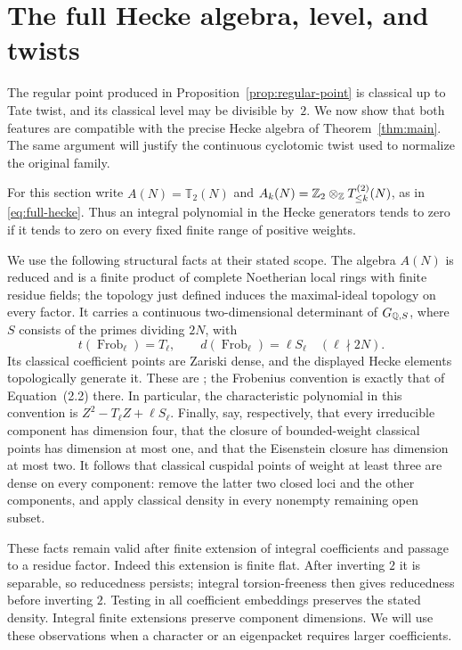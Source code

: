 \section{The full Hecke algebra, level, and twists}
\label{sec:hecke}

The regular point produced in Proposition~\ref{prop:regular-point}
is classical up to Tate twist, and its classical level may be divisible
by~$2$.  We now show that both features are compatible with the precise
Hecke algebra of Theorem~\ref{thm:main}.  The same argument will justify
the continuous cyclotomic twist used to normalize the original family.

For this section write $A(N)=\mathbb T_2(N)$ and
$A_k(N)=\mathbb Z_2\otimes_{\mathbb Z}T_{\leq k}^{(2)}(N)$, as in
\eqref{eq:full-hecke}. Thus an integral polynomial in the Hecke
generators tends to zero if it tends to zero on every fixed finite
range of positive weights.

We use the following structural facts at their stated scope.
The algebra $A(N)$ is reduced and is a finite product of complete
Noetherian local rings with finite residue fields; the topology just
defined induces the maximal-ideal topology on every factor.
It carries a continuous two-dimensional determinant of
$G_{\mathbb Q,S}$, where $S$ consists of the primes dividing $2N$, with
\begin{equation}\label{eq:hecke-frobenius}
 t(\operatorname{Frob}_\ell)=T_\ell,
 \qquad d(\operatorname{Frob}_\ell)=\ell S_\ell
 \quad (\ell\nmid 2N).
\end{equation}
Its classical coefficient points are Zariski dense, and the displayed
Hecke elements topologically generate it.  These are
\cite[Lemmas~2.1--2.2 and Proposition~2.3]{Dim}; the Frobenius
convention is exactly that of Equation~(2.2) there.  In particular, the
characteristic polynomial in this convention is
$Z^2-T_\ell Z+\ell S_\ell$.  Finally,
\cite[Theorem~1.1 and Proposition~3.1]{Dim} say, respectively, that
every irreducible component has dimension four, that the closure of
bounded-weight classical points has dimension at most one, and that
the Eisenstein closure has dimension at most two.  It follows that
classical cuspidal points of weight at least three are dense on every
component: remove the latter two closed loci and the other components,
and apply classical density in every nonempty remaining open subset.

These facts remain valid after finite extension of integral
coefficients and passage to a residue factor.  Indeed this extension
is finite flat.  After inverting $2$ it is separable, so reducedness
persists; integral torsion-freeness then gives reducedness before
inverting $2$.  Testing in all coefficient embeddings preserves the
stated density.  Integral finite extensions preserve component
dimensions.  We will use these observations when a character or an
eigenpacket requires larger coefficients.

